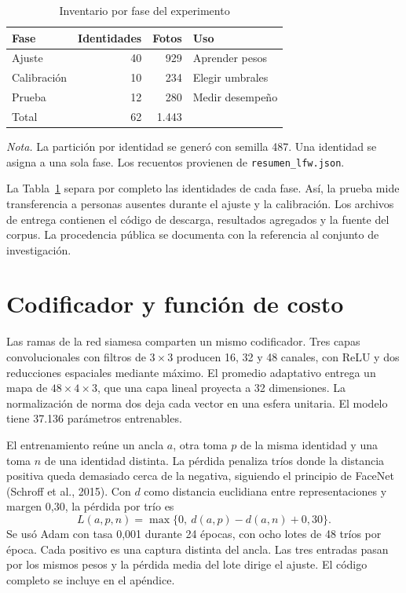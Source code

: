 \documentclass[12pt,letterpaper]{article}
\begin{document}
\begin{table}[H]
\caption{Inventario por fase del experimento}\label{tab:particiones}
\centering
\begin{tabular}{lrrl}\toprule
Fase & Identidades & Fotos & Uso\\\midrule
Ajuste & 40 & 929 & Aprender pesos\\
Calibración & 10 & 234 & Elegir umbrales\\
Prueba & 12 & 280 & Medir desempeño\\\midrule
Total & 62 & 1.443 & \\\bottomrule
\end{tabular}
\par\vspace{4pt}\raggedright\footnotesize\textit{Nota.} La partición por identidad se generó con semilla 487. Una identidad se asigna a una sola fase. Los recuentos provienen de \texttt{resumen\_lfw.json}.
\end{table}

La Tabla~\ref{tab:particiones} separa por completo las identidades de cada fase. Así, la prueba mide transferencia a personas ausentes durante el ajuste y la calibración. Los archivos de entrega contienen el código de descarga, resultados agregados y la fuente del corpus. La procedencia pública se documenta con la referencia al conjunto de investigación.

\section{Codificador y función de costo}
Las ramas de la red siamesa comparten un mismo codificador. Tres capas convolucionales con filtros de $3\times3$ producen 16, 32 y 48 canales, con ReLU y dos reducciones espaciales mediante máximo. El promedio adaptativo entrega un mapa de $48\times4\times3$, que una capa lineal proyecta a 32 dimensiones. La normalización de norma dos deja cada vector en una esfera unitaria. El modelo tiene 37.136 parámetros entrenables.

El entrenamiento reúne un ancla $a$, otra toma $p$ de la misma identidad y una toma $n$ de una identidad distinta. La pérdida penaliza tríos donde la distancia positiva queda demasiado cerca de la negativa, siguiendo el principio de FaceNet (Schroff et al., 2015). Con $d$ como distancia euclidiana entre representaciones y margen 0,30, la pérdida por trío es
\[
  L(a,p,n)=\max\{0,\ d(a,p)-d(a,n)+0{,}30\}.
\]
Se usó Adam con tasa 0,001 durante 24 épocas, con ocho lotes de 48 tríos por época. Cada positivo es una captura distinta del ancla. Las tres entradas pasan por los mismos pesos y la pérdida media del lote dirige el ajuste. El código completo se incluye en el apéndice.
\end{document}
